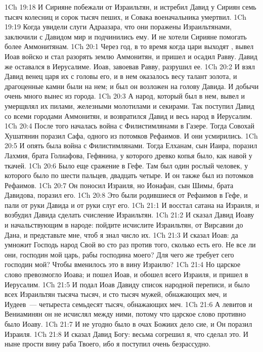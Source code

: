 \vs 1Ch 19:18 И Сирияне побежали от Израильтян, и истребил Давид у Сириян семь тысяч колесниц и сорок тысяч пеших, и Совака военачальника умертвил.
\vs 1Ch 19:19 Когда увидели слуги Адраазара, что они поражены Израильтянами, заключили с Давидом мир и подчинились ему. И не хотели Сирияне помогать более Аммонитянам.
\vs 1Ch 20:1 Через год, в то время когда цари выходят , вывел Иоав войско и стал разорять землю Аммонитян, и пришел и осадил Равву. Давид же оставался в Иерусалиме. Иоав, завоевав Равву, разрушил ее.
\vs 1Ch 20:2 И взял Давид венец царя их с головы его, и в нем оказалось весу талант золота, и драгоценные камни были на нем; и был он возложен на голову Давида. И добычи очень много вынес из города.
\vs 1Ch 20:3 А народ, который был в нем, вывел и умерщвлял их пилами, железными молотилами и секирами. Так поступил Давид со всеми городами Аммонитян, и возвратился Давид и весь народ в Иерусалим.
\rsbpar\vs 1Ch 20:4 После того началась война с Филистимлянами в Газере. Тогда Совохай Хушатянин поразил Сафа, одного из потомков Рефаимов. И они усмирились.
\vs 1Ch 20:5 И опять была война с Филистимлянами. Тогда Елханам, сын Иаира, поразил Лахмия, брата Голиафова, Гефянина, у которого древко копья было, как навой у ткачей.
\vs 1Ch 20:6 Было еще сражение в Гефе. Там был один рослый человек, у которого было по шести пальцев,  двадцать четыре. И он также был из потомков Рефаимов.
\vs 1Ch 20:7 Он поносил Израиля, но Ионафан, сын Шимы, брата Давидова, поразил его.
\vs 1Ch 20:8 Это были родившиеся от Рефаимов в Гефе, и пали от руки Давида и от руки слуг его.
\vs 1Ch 21:1 И восстал сатана на Израиля, и возбудил Давида сделать счисление Израильтян.
\vs 1Ch 21:2 И сказал Давид Иоаву и начальствующим в народе: пойдите исчислите Израильтян, от Вирсавии до Дана, и представьте мне, чтоб я знал число их.
\vs 1Ch 21:3 И сказал Иоав: да умножит Господь народ Свой во сто раз против того, сколько есть его. Не все ли они, господин мой царь, рабы господина моего? Для чего же требует сего господин мой? Чтобы вменилось это в вину Израилю?
\vs 1Ch 21:4 Но царское слово превозмогло Иоава; и пошел Иоав, и обошел всего Израиля, и пришел в Иерусалим.
\vs 1Ch 21:5 И подал Иоав Давиду список народной переписи, и было всех Израильтян тысяча тысяч, и сто тысяч мужей, обнажающих меч, и Иудеев~--- четыреста семьдесят тысяч, обнажающих меч.
\vs 1Ch 21:6 А левитов и Вениаминян он не исчислял между ними, потому что царское слово противно было Иоаву.
\rsbpar\vs 1Ch 21:7 И не угодно было в очах Божиих дело сие, и Он поразил Израиля.
\vs 1Ch 21:8 И сказал Давид Богу: весьма согрешил я, что сделал это. И ныне прости вину раба Твоего, ибо я поступил очень безрассудно.
